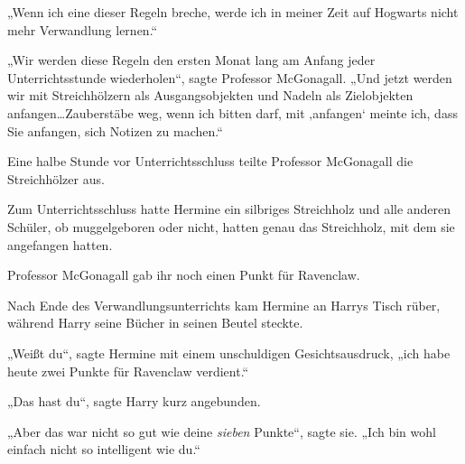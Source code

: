 „Wenn ich eine dieser Regeln breche, werde ich in meiner Zeit auf Hogwarts nicht mehr Verwandlung lernen.“

„Wir werden diese Regeln den ersten Monat lang am Anfang jeder Unterrichtsstunde wiederholen“, sagte Professor McGonagall. „Und jetzt werden wir mit Streichhölzern als Ausgangsobjekten und Nadeln als Zielobjekten anfangen…Zauberstäbe weg, wenn ich bitten darf, mit ‚anfangen‘ meinte ich, dass Sie anfangen, sich Notizen zu machen.“

Eine halbe Stunde vor Unterrichtsschluss teilte Professor McGonagall die Streichhölzer aus.

Zum Unterrichtsschluss hatte Hermine ein silbriges Streichholz und alle anderen Schüler, ob muggelgeboren oder nicht, hatten genau das Streichholz, mit dem sie angefangen hatten.

Professor McGonagall gab ihr noch einen Punkt für Ravenclaw.

\later

Nach Ende des Verwandlungsunterrichts kam Hermine an Harrys Tisch rüber, während Harry seine Bücher in seinen Beutel steckte.

„Weißt du“, sagte Hermine mit einem unschuldigen Gesichtsausdruck, „ich habe heute zwei Punkte für Ravenclaw verdient.“

„Das hast du“, sagte Harry kurz angebunden.

„Aber das war nicht so gut wie deine \emph{sieben} Punkte“, sagte sie. „Ich bin wohl einfach nicht so intelligent wie du.“

